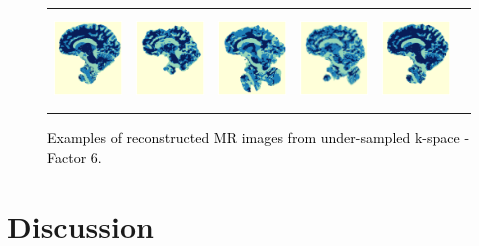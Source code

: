 \documentclass[review]{elsarticle}
\begin{document}
\begin{figure}[H]
\begin{raggedleft}
\begin{tabular}{cccccc}
			\includegraphics[width=2.5cm,height=2.5cm]{include/grp2/factor6/022-Guys-0701-T1/022-Guys-0701-T1_segs__50} &
			\includegraphics[width=2.5cm,height=2.5cm]{include/grp2/factor6/022-Guys-0701-T1/022-Guys-0701-T1_segs__zeroPadding_50} & \includegraphics[width=2.5cm,height=2.5cm]{include/grp2/factor6/022-Guys-0701-T1/022-Guys-0701-T1_segs__CS_50} & \includegraphics[width=2.5cm]{include/grp2/factor6/022-Guys-0701-T1/022-Guys-0701-T1_segs__IMCNNL2TUNE_50} & \includegraphics[width=2.5cm,height=2.5cm]{include/grp2/factor6/022-Guys-0701-T1/022-Guys-0701-T1_segs__predict_50}
			
			
		\end{tabular}
		\par\end{raggedleft}
	\raggedright{}\caption{\textcolor{black}{\footnotesize{}Examples of reconstructed MR images from under-sampled k-space - Factor 6.}}
	\label{fig:example_factor_6} 
\end{figure}

\section{Discussion}\label{conclusions_section}
\end{document}
